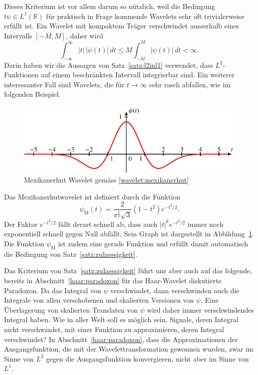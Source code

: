 Dieses Kriterium ist vor allem darum so nützlich, weil die Bedingung
$t\psi\in L^1(\mathbb R)$ für praktisch in Frage kommende Wavelets sehr
oft trivialerweise erfüllt ist.
Ein Wavelet mit kompaktem Träger verschwindet ausserhalb eines Intervalls
$[-M,M]$, daher wird 
\[
\int_{-\infty}^\infty |t|\,|\psi(t)|\,dt
\le 
M \int_{-M}^M |\psi(t)|\,dt < \infty.
\]
Darin haben wir die Aussagen von Satz~\ref{satz:l2inl1} verwendet,
dass $L^2$-Funktionen auf einem beschränkten Intervall integrierbar sind.
Ein weiterer interessanter Fall sind Wavelets, die für $t\to\infty$
sehr rasch abfallen, wie im folgenden Beispiel.

\begin{beispiel}
\begin{figure}
\centering
\includegraphics{chapters/4-cwt/images/mexican.pdf}
\caption{Mexikanerhut Wavelet gemäss
\eqref{wavelet:mexikanerhut}
\label{wavelet:mexikanerhut:graph}}
\end{figure}
Das Mexikanerhutwavelet ist definiert durch die Funktion
\begin{equation}
\psi_{\text{M}}(t) = \frac{2}{\pi^{\frac14}\sqrt{3}}(1-t^2) e^{-t^2/2}.
\label{wavelet:mexikanerhut}
\end{equation}
Der Faktor $e^{-t^2/2}$ fällt derart schnell ab, dass auch $|t|^k e^{-t^2/2}$
immer noch exponentiell schnell gegen Null abfällt.
Sein Graph ist dargestellt in Abbildung~\ref{wavelet:mexikanerhut:graph}.
Die Funktion $\psi_{\text{M}}$ ist zudem eine gerade Funktion und %
erfüllt damit automatisch die Bedingung von Satz~\ref{satz:zulaessigkeit}.
\end{beispiel}

Das Kriterium von Satz~\ref{satz:zulaessigkeit} führt uns aber auch auf
das folgende, bereits in Abschnitt~\ref{haar:paradoxon} für das Haar-Wavelet
diskutierte Paradoxon. 
Da das Integral von $\psi$ verschwindet, dann verschwinden auch die Integrale
von allen verschobenen und skalierten Versionen von $\psi$.
Eine Überlagerung von skalierten Translaten von $\psi$ wird daher
immer verschwindendes Integral haben.
Wie in aller Welt soll es möglich sein, Signale, deren Integral nicht 
verschwindet, mit einer Funktion zu approximieren, deren Integral
verschwindet?
In Abschnitt~\ref{haar:paradoxon}, dass die Approximationen der Ausgangsfunktion,
die mit der Wavelettransformation gewonnen wurden, zwar im Sinne von $L^2$
gegen die Ausgangsfunktion konvergieren, nicht aber im Sinne von $L^1$.



